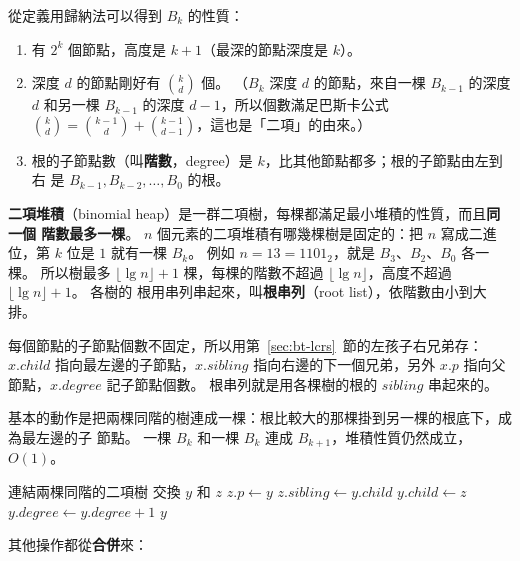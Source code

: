 從定義用歸納法可以得到 $B_k$ 的性質：

\begin{enumerate}
\item 有 $2^k$ 個節點，高度是 $k + 1$（最深的節點深度是 $k$）。
\item 深度 $d$ 的節點剛好有 $\binom{k}{d}$ 個。 （$B_k$ 深度 $d$ 的節點，來自一棵 $B_{k-1}$
的深度 $d$ 和另一棵 $B_{k-1}$ 的深度 $d - 1$，所以個數滿足巴斯卡公式
$\binom{k}{d} = \binom{k-1}{d} + \binom{k-1}{d-1}$，這也是「二項」的由來。）
\item 根的子節點數（叫\textbf{階數}，degree）是 $k$，比其他節點都多；根的子節點由左到右
是 $B_{k-1}, B_{k-2}, \ldots, B_0$ 的根。
\end{enumerate}

\textbf{二項堆積}（binomial heap）是一群二項樹，每棵都滿足最小堆積的性質，而且\textbf{同一個
階數最多一棵}。 $n$ 個元素的二項堆積有哪幾棵樹是固定的：把 $n$ 寫成二進位，第 $k$ 位是
$1$ 就有一棵 $B_k$。 例如 $n = 13 = 1101_2$，就是 $B_3$、$B_2$、$B_0$ 各一棵。 所以樹最多
$\lfloor \lg n \rfloor + 1$ 棵，每棵的階數不超過 $\lfloor \lg n \rfloor$，高度不超過
$\lfloor \lg n \rfloor + 1$。 各樹的
根用串列串起來，叫\textbf{根串列}（root list），依階數由小到大排。

每個節點的子節點個數不固定，所以用第~\ref{sec:bt-lcrs}~節的左孩子右兄弟存：
$x.\mathit{child}$ 指向最左邊的子節點，$x.\mathit{sibling}$ 指向右邊的下一個兄弟，另外
$x.p$ 指向父節點，$x.\mathit{degree}$ 記子節點個數。 根串列就是用各棵樹的根的
$\mathit{sibling}$ 串起來的。

基本的動作是把兩棵同階的樹連成一棵：根比較大的那棵掛到另一棵的根底下，成為最左邊的子
節點。 一棵 $B_k$ 和一棵 $B_k$ 連成 $B_{k+1}$，堆積性質仍然成立，$O(1)$。

\begin{pseudo}[label=alg:hp-binomial-link]{連結兩棵同階的二項樹}
 
        \State 交換 $y$ 和 $z$
    \EndIf
    \State $z.p \gets y$
    \State $z.\mathit{sibling} \gets y.\mathit{child}$ 
    \State $y.\mathit{child} \gets z$
    \State $y.\mathit{degree} \gets y.\mathit{degree} + 1$
    \State \Return $y$
\EndFunction
\end{pseudo}

其他操作都從\textbf{合併}來：

